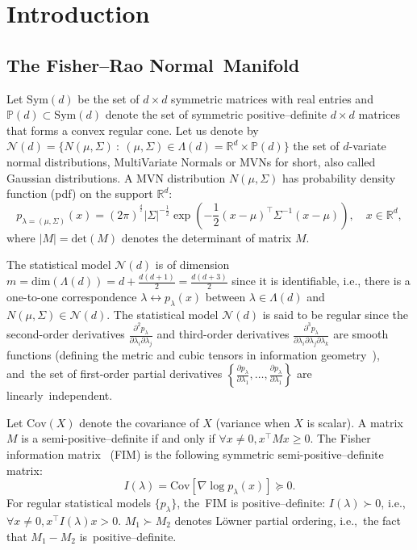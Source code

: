 \documentclass[entropy,article,accept,oneauthor,pdftex,entropy]{Definitions/mdpi}
\def\Sym{\mathrm{Sym}}
\def\det{\mathrm{det}}
\def\bbP{\mathbb{P}}
\def\Sym{\mathrm{Sym}}
\def\bbR{\mathbb{R}}
\def\calN{\mathcal{N}}
\def\dim{\mathrm{dim}}
\def\st{\ :\ }
\def\bbR{\mathbb{R}}
\def\Cov{\mathrm{Cov}}
\begin{document}
\section{Introduction}

\subsection{The Fisher--Rao Normal~Manifold}

Let $\Sym(d)$ be the set of $d\times d$ symmetric matrices with real entries and $\bbP(d)\subset\Sym(d)$ denote the set of symmetric positive–definite $d\times d$ matrices that forms a convex regular cone.
Let us denote by $\calN(d)=\{N(\mu,\Sigma) \st (\mu,\Sigma)\in\Lambda(d)=\bbR^d\times \bbP(d)\}$   the set of $d$-variate normal distributions, MultiVariate Normals or  MVNs for short, also called Gaussian distributions.
A MVN distribution $N(\mu,\Sigma)$ has probability density function (pdf) on the support $\bbR^d$:
$$
p_{\lambda=(\mu,\Sigma)}(x)= (2\pi)^{^\frac{d}{2}} |\Sigma|^{-\frac{1}{2}} \exp\left(-\frac{1}{2}(x-\mu)^\top\Sigma^{-1}(x-\mu)\right)
 ,\quad x\in\bbR^d,
$$
where $|M|=\det(M)$ denotes the determinant of matrix $M$.

The statistical model $\calN(d)$ is of dimension $m=\dim(\Lambda(d))=d+\frac{d(d+1)}{2}=\frac{d(d+3)}{2}$ since it is identifiable, i.e.,
there is a one-to-one correspondence $\lambda \leftrightarrow p_\lambda(x)$ between $\lambda\in\Lambda(d)$ and $N(\mu,\Sigma)\in\calN(d)$.
The statistical model $\calN(d)$ is said to be regular since the second-order derivatives $\frac{\partial^2 p_{\lambda}}{\partial\lambda_i\partial\lambda_j}$ and third-order derivatives $\frac{\partial^3 p_{\lambda}}{\partial\lambda_i\partial\lambda_j\partial\lambda_k}$ are smooth functions (defining the metric and cubic tensors in information geometry~\cite{IG-2016}), and~the set of first-order partial derivatives $\left\{\frac{\partial p_{\lambda}}{\partial\lambda_1},\ldots,\frac{\partial p_{\lambda}}{\partial\lambda_1}\right\}$ are linearly~independent.


Let $\Cov(X)$ denote the covariance of $X$ (variance when $X$ is scalar). 
A matrix $M$ is a semi-positive–definite if and only if $\forall x\not=0, x^\top M x\geq 0$.
The Fisher information matrix~\cite{calin2014geometric,IG-2016} (FIM) is the following symmetric semi-positive–definite matrix:
$$
I(\lambda)=\Cov[\nabla\log p_{\lambda}(x)]\succeq 0.
$$
{For} 
 regular statistical models $\{p_\lambda\}$, the~FIM  is positive–definite: $I(\lambda)\succ 0$, i.e.,~$\forall x\not=0, x^\top I(\lambda) x>0$. $M_1 \succ M_2$ denotes L\"owner partial ordering, i.e.,~the fact that $M_1-M_2$ is~positive–definite. 
\end{document}
